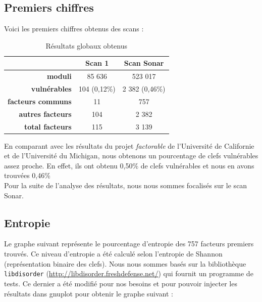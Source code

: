 \subsection{Premiers chiffres}
Voici les premiers chiffres obtenus des scans :


\begin{table}[H]
\centering
\begin{tabular}{|r|c|c|}
\hline
\textbf{}&\textbf{Scan 1}&\textbf{Scan Sonar}\\
\hline
\textbf{moduli}&85 636&523 017\\
\hline
\textbf{vulnérables}&104 (0,12\%)&2 382 (0,46\%)\\
\hline
\textbf{facteurs communs}&11&757\\
\hline
\textbf{autres facteurs}&104&2 382\\
\hline
\textbf{total facteurs}&115&3 139\\
\hline
\end{tabular}

\caption{Résultats globaux obtenus}
\label{res}
\end{table}

En comparant avec les résultats du projet \textit{factorable} de l'Université de Californie et de l'Université du Michigan, nous obtenons un pourcentage de clefs vulnérables assez proche. En effet, ils ont obtenu 0,50\% de clefs vulnérables et nous en avons trouvées 0,46\% \\


Pour la suite de l'analyse des résultats, nous nous sommes focalisés sur le scan Sonar.

\subsection{Entropie}
Le graphe suivant représente le pourcentage d'entropie des 757 facteurs premiers trouvés. Ce niveau d'entropie a été calculé selon l'entropie de Shannon (représentation binaire des clefs). Nous nous sommes basés sur la bibliothèque \verb+libdisorder+ (\url{http://libdisorder.freshdefense.net/}) qui fournit un programme de tests. Ce dernier a été modifié pour nos besoins et pour pouvoir injecter les résultats dans gnuplot pour obtenir le graphe suivant :

